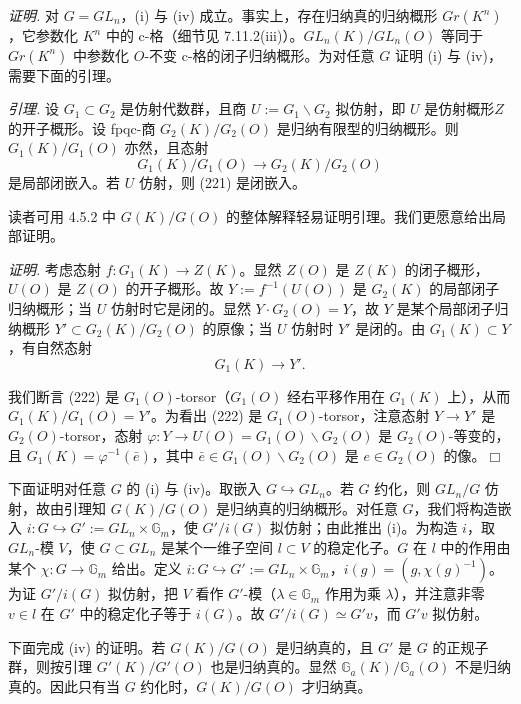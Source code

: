 \emph{证明.} 对 $G=GL_n$，(i) 与 (iv) 成立。事实上，存在归纳真的归纳概形 $Gr(K^n)$，它参数化 $K^n$ 中的 c-格（细节见 7.11.2(iii)）。$GL_n(K)/GL_n(O)$ 等同于 $Gr(K^n)$ 中参数化 $O$-不变 c-格的闭子归纳概形。为对任意 $G$ 证明 (i) 与 (iv)，需要下面的引理。

\emph{引理.} 设 $G_1\subset G_2$ 是仿射代数群，且商 $U:=G_1\backslash G_2$ 拟仿射，即 $U$ 是仿射概形$Z$ 的开子概形。设 fpqc-商 $G_2(K)/G_2(O)$ 是归纳有限型的归纳概形。则 $G_1(K)/G_1(O)$ 亦然，且态射
\begin{equation}\tag{221}
G_1(K)/G_1(O)\to G_2(K)/G_2(O)
\end{equation}
是局部闭嵌入。若 $U$ 仿射，则 (221) 是闭嵌入。

读者可用 4.5.2 中 $G(K)/G(O)$ 的整体解释轻易证明引理。我们更愿意给出局部证明。

\emph{证明.} 考虑态射 $f:G_1(K)\to Z(K)$。显然 $Z(O)$ 是 $Z(K)$ 的闭子概形，$U(O)$ 是 $Z(O)$ 的开子概形。故 $Y:=f^{-1}(U(O))$ 是 $G_2(K)$ 的局部闭子归纳概形；当 $U$ 仿射时它是闭的。显然 $Y\cdot G_2(O)=Y$，故 $Y$ 是某个局部闭子归纳概形 $Y'\subset G_2(K)/G_2(O)$ 的原像；当 $U$ 仿射时 $Y'$ 是闭的。由 $G_1(K)\subset Y$，有自然态射
\begin{equation}\tag{222}
G_1(K)\to Y'.
\end{equation}

我们断言 (222) 是 $G_1(O)$-torsor（$G_1(O)$ 经右平移作用在 $G_1(K)$ 上），从而 $G_1(K)/G_1(O)=Y'$。为看出 (222) 是 $G_1(O)$-torsor，注意态射 $Y\to Y'$ 是 $G_2(O)$-torsor，态射 $\varphi:Y\to U(O)=G_1(O)\backslash G_2(O)$ 是 $G_2(O)$-等变的，且 $G_1(K)=\varphi^{-1}(\bar e)$，其中 $\bar e\in G_1(O)\backslash G_2(O)$ 是 $e\in G_2(O)$ 的像。\hfill$\Box$

下面证明对任意 $G$ 的 (i) 与 (iv)。取嵌入 $G\hookrightarrow GL_n$。若 $G$ 约化，则 $GL_n/G$ 仿射，故由引理知 $G(K)/G(O)$ 是归纳真的归纳概形。对任意 $G$，我们将构造嵌入 $i:G\hookrightarrow G':=GL_n\times\mathbb{G}_m$，使 $G'/i(G)$ 拟仿射；由此推出 (i)。为构造 $i$，取 $GL_n$-模 $V$，使 $G\subset GL_n$ 是某个一维子空间 $l\subset V$ 的稳定化子。$G$ 在 $l$ 中的作用由某个 $\chi:G\to\mathbb{G}_m$ 给出。定义 $i:G\hookrightarrow G':=GL_n\times\mathbb{G}_m$，$i(g)=(g,\chi(g)^{-1})$。为证 $G'/i(G)$ 拟仿射，把 $V$ 看作 $G'$-模（$\lambda\in\mathbb{G}_m$ 作用为乘 $\lambda$），并注意非零 $v\in l$ 在 $G'$ 中的稳定化子等于 $i(G)$。故 $G'/i(G)\simeq G'v$，而 $G'v$ 拟仿射。


下面完成 (iv) 的证明。若 $G(K)/G(O)$ 是归纳真的，且 $G'$ 是 $G$ 的正规子群，则按引理 $G'(K)/G'(O)$ 也是归纳真的。显然 $\mathbb{G}_a(K)/\mathbb{G}_a(O)$ 不是归纳真的。因此只有当 $G$ 约化时，$G(K)/G(O)$ 才归纳真。


